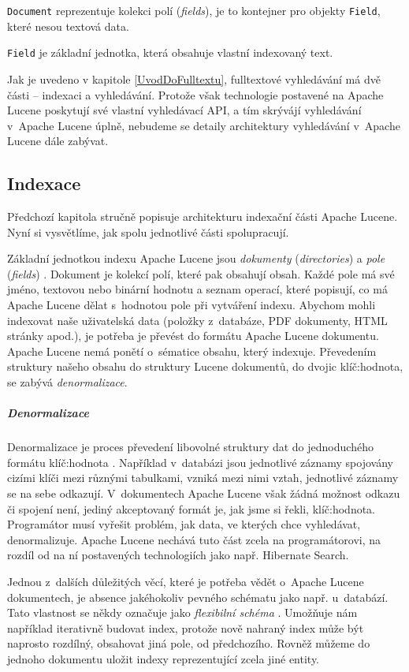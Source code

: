 \documentclass[11pt,oneside]{fithesis2}
\begin{document}
\texttt{Document} reprezentuje kolekci polí (\emph{fields}), je to kontejner pro objekty \texttt{Field}, které nesou textová data. 

\texttt{Field} je základní jednotka, která obsahuje vlastní indexovaný text.

Jak je uvedeno v kapitole \ref{UvodDoFulltextu}, fulltextové vyhledávání má dvě části -- indexaci a vyhledávání. Protože však technologie postavené na Apache Lucene poskytují své vlastní vyhledávací API, a tím skrývájí vyhledávání v~Apache Lucene úplně, nebudeme se detaily architektury vyhledávání v~Apache Lucene dále zabývat. 

\subsection{Indexace}
Předchozí kapitola stručně popisuje architekturu indexační části Apache Lucene. Nyní si vysvětlíme, jak spolu jednotlivé části spolupracují.

Základní jednotkou indexu Apache Lucene jsou \emph{dokumenty} (\emph{directories}) a \emph{pole} (\emph{fields}) \cite[s.~32]{LuceneAction}. Dokument je kolekcí polí, které pak obsahují  obsah. Každé pole má své jméno, textovou nebo binární hodnotu a seznam operací, které popisují, co má Apache Lucene dělat s~hodnotou pole při vytváření indexu. Abychom mohli indexovat naše uživatelská data (položky z~databáze, PDF dokumenty, HTML stránky apod.), je potřeba je převést do formátu Apache Lucene dokumentu. Apache Lucene nemá ponětí o~sématice obsahu, který indexuje. Převedením struktury našeho obsahu do struktury Lucene dokumentů, do dvojic klíč:hodnota, se zabývá \emph{denormalizace}.

\subparagraph{Denormalizace}
Denormalizace je proces převedení libovolné struktury dat do jednoduchého formátu klíč:hodnota \cite[s.~34]{LuceneAction}. Například v~databázi jsou jednotlivé záznamy spojovány cizími klíči mezi různými tabulkami, vzniká mezi nimi vztah, jednotlivé záznamy se na sebe odkazují. V~dokumentech Apache Lucene však žádná možnost odkazu či spojení není, jediný akceptovaný formát je, jak jsme si řekli, klíč:hodnota. Programátor musí vyřešit problém, jak data, ve kterých chce vyhledávat, denormalizuje. Apache Lucene nechává tuto část zcela na programátorovi, na rozdíl od na ní postavených technologiích jako např. Hibernate Search.

Jednou z~dalších důležitých věcí, které je potřeba vědět o~Apache Lucene dokumentech, je absence jakéhokoliv pevného schématu jako např. u~databází. Tato vlastnost se někdy označuje jako \emph{flexibilní schéma} \cite[s.~34]{LuceneAction}. Umožňuje nám například iterativně budovat index, protože nově nahraný index může být naprosto rozdílný, obsahovat jiná pole, od předchozího. Rovněž můžeme do jednoho dokumentu uložit indexy reprezentující zcela jiné entity.
\end{document}
